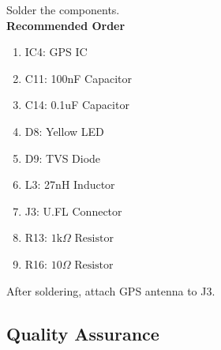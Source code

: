 \documentclass{article}
\newcommand{\resistor}[1]{$\text{#1} \Omega \text{ Resistor}$}
\begin{document}
Solder the components. \\

\noindent \textbf{Recommended Order}

\begin{enumerate}
  \item IC4: GPS IC
  \item C11: 100nF Capacitor
  \item C14: 0.1uF Capacitor
  \item D8: Yellow LED
  \item D9: TVS Diode
  \item L3: 27nH Inductor
  \item J3: U.FL Connector
  \item R13: \resistor{1k}
  \item R16: \resistor{10}
\end{enumerate}

After soldering, attach GPS antenna to J3.

\subsection{Quality Assurance}
\end{document}
